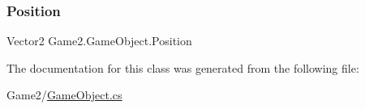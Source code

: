 \mbox{\label{class_game2_1_1_game_object_af5b0b48192336247e09d52a7fc6f56ad}} 
\subsubsection{\texorpdfstring{Position}{Position}}
{\footnotesize\ttfamily Vector2 Game2.\+Game\+Object.\+Position\hspace{0.3cm}{\ttfamily [get]}}



The documentation for this class was generated from the following file\+:\begin{DoxyCompactItemize}
\item 
Game2/\mbox{\hyperlink{_game_object_8cs}{Game\+Object.\+cs}}\end{DoxyCompactItemize}
